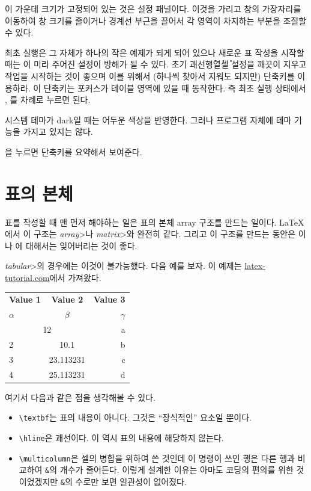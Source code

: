 \documentclass{simplman}
\let\ksemph\respectdotemph
\newcommand*\env[1]{\<2\textit{#1}>}
\begin{document}
이 가운데 크기가 고정되어 있는 것은 \textcolor{green5}{설정 패널}이다. 이것을 가리고 창의 가장자리를 이동하여 창 크기를 줄이거나 경계선 부근을 끌어서 각 영역이 차지하는 부분을 조절할 수 있다.

\begin{Chamgo}
최초 실행은 그 자체가 하나의 작은 예제가 되게 되어 있으나 새로운 표 작성을 시작할 때는 이 미리 주어진 설정이 방해가 될 수 있다. 초기 괘선\.행\.열\.셀 설정을 깨끗이 지우고 작업을 시작하는 것이 좋으며 이를 위해서 (하나씩 찾아서 지워도 되지만)  단축키를 이용하라. 이 단축키는 포커스가 테이블 영역에 있을 때 동작한다. 즉 최초 실행 상태에서 , 를 차례로 누르면 된다.
\end{Chamgo}

시스템 테마가 dark일 때는 어두운 색상을 반영한다. 그러나 프로그램 자체에 테마 기능을 가지고 있지는 않다.

을 누르면 단축키를 요약해서 보여준다.

\chapter{표의 본체}

표를 작성할 때 맨 먼저 해야하는 일은 표의 본체 array 구조를 만드는 일이다.
\LaTeX 에서 이 구조는 \env{array}나 \env{matrix}와 완전히 같다.
그리고 이 구조를 만드는 동안은 \ksemph{괘선}이나 \ksemph{폰트, 정렬, 색상}에 대해서는 잊어버리는 것이 좋다.

\env{tabular}의 경우에는 이것이 불가능했다. 다음 예를 보자. 이 예제는 \href{https://latex-tutorial.com/tutorials/tables/}{\ttfamily latex-tutorial.com}에서 가져왔다.

\begin{widetext}
\begin{exampleside}
\begin{tabular}{l|c|r}
\textbf{Value 1} & \textbf{Value 2} & \textbf{Value 3}\\
$\alpha$ & $\beta$ & $\gamma$ \\ \hline
\multicolumn{2}{c|}{12} & a\\ \hline
2 & 10.1 & b\\
3 & 23.113231 & c\\
4 & 25.113231 & d\\
\end{tabular}
\end{exampleside}
\end{widetext}

여기서 다음과 같은 점을 생각해볼 수 있다.
\begin{itemize} \oblivoirlist
\item \verb|\textbf|는 표의 내용이 아니다. 그것은 ``장식적인'' 요소일 뿐이다.
\item \verb|\hline|은 괘선이다. 이 역시 표의 내용에 해당하지 않는다.
\item \verb|\multicolumn|은 셀의 병합을 위하여 쓴 것인데 이 명령이 쓰인 행은 다른 행과 비교하여 \verb|&|의 개수가 줄어든다. 이렇게 설계한 이유는 아마도 코딩의 편의를 위한 것이었겠지만 \verb|&|의 수로만 보면 일관성이 없어졌다.
\end{itemize}
\end{document}

